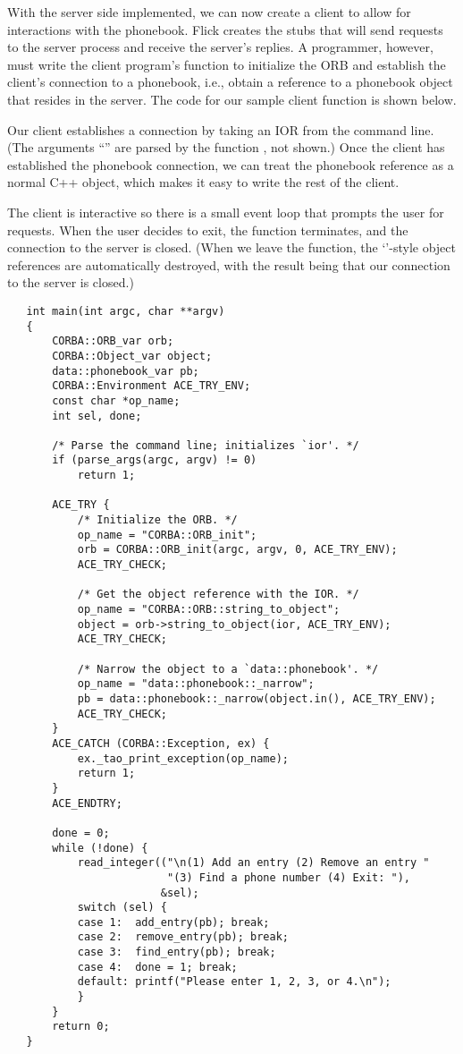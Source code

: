 With the server side implemented, we can now create a client to allow for
interactions with the phonebook.  Flick creates the stubs that will send
requests to the server process and receive the server's replies.  A programmer,
however, must write the client program's  function to
initialize the ORB and establish the client's connection to a phonebook, i.e.,
obtain a reference to a phonebook object that resides in the server.  The code
for our sample client  function is shown below.

Our client establishes a connection by taking an IOR from the command line.
(The arguments ``'' are parsed by the function
, not shown.)  Once the client has established the
phonebook connection, we can treat the phonebook reference as a normal C++
object, which makes it easy to write the rest of the client.

The client is interactive so there is a small event loop that prompts the user
for requests.  When the user decides to exit, the  function
terminates, and the connection to the server is closed.  (When we leave the
 function, the `'-style object references are
automatically destroyed, with the result being that our connection to the
server is closed.)

\begin{verbatim}
   int main(int argc, char **argv)
   {
       CORBA::ORB_var orb;
       CORBA::Object_var object;
       data::phonebook_var pb;
       CORBA::Environment ACE_TRY_ENV;
       const char *op_name;
       int sel, done;

       /* Parse the command line; initializes `ior'. */
       if (parse_args(argc, argv) != 0)
           return 1;

       ACE_TRY {
           /* Initialize the ORB. */
           op_name = "CORBA::ORB_init";
           orb = CORBA::ORB_init(argc, argv, 0, ACE_TRY_ENV);
           ACE_TRY_CHECK;

           /* Get the object reference with the IOR. */
           op_name = "CORBA::ORB::string_to_object";
           object = orb->string_to_object(ior, ACE_TRY_ENV);
           ACE_TRY_CHECK;

           /* Narrow the object to a `data::phonebook'. */
           op_name = "data::phonebook::_narrow";
           pb = data::phonebook::_narrow(object.in(), ACE_TRY_ENV);
           ACE_TRY_CHECK;
       }
       ACE_CATCH (CORBA::Exception, ex) {
           ex._tao_print_exception(op_name);
           return 1;
       }
       ACE_ENDTRY;

       done = 0;
       while (!done) {
           read_integer(("\n(1) Add an entry (2) Remove an entry "
                         "(3) Find a phone number (4) Exit: "),
                        &sel);
           switch (sel) {
           case 1:  add_entry(pb); break;
           case 2:  remove_entry(pb); break;
           case 3:  find_entry(pb); break;
           case 4:  done = 1; break;
           default: printf("Please enter 1, 2, 3, or 4.\n");
           }
       }
       return 0;
   }
\end{verbatim}

